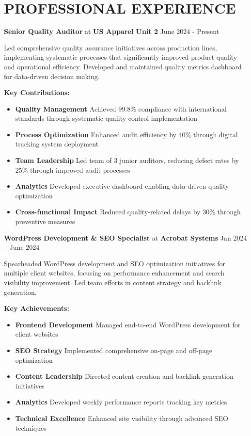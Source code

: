 \documentclass[11pt,a4paper]{article}
\newcommand{\role}[2]{{\large\textbf{#1}} \textcolor{secondary}{at} {\large\textbf{#2}}}
\newcommand{\daterange}[1]{{\color{secondary}\hfill#1}}
\newcommand{\achievement}[2]{\textbf{\textcolor{primary}{#1}} #2}
\begin{document}
\section*{PROFESSIONAL EXPERIENCE}

\role{Senior Quality Auditor}{US Apparel Unit 2} \daterange{June 2024 - Present}
\vspace{0.2cm}

Led comprehensive quality assurance initiatives across production lines, implementing systematic processes that significantly improved product quality and operational efficiency. Developed and maintained quality metrics dashboard for data-driven decision making.

\vspace{0.3cm}
\textbf{\textcolor{primary}{Key Contributions:}}
\begin{itemize}[leftmargin=*,nosep,itemsep=5pt]
\item \achievement{Quality Management}{Achieved 99.8\% compliance with international standards through systematic quality control implementation}
\item \achievement{Process Optimization}{Enhanced audit efficiency by 40\% through digital tracking system deployment}
\item \achievement{Team Leadership}{Led team of 3 junior auditors, reducing defect rates by 25\% through improved audit processes}
\item \achievement{Analytics}{Developed executive dashboard enabling data-driven quality optimization}
\item \achievement{Cross-functional Impact}{Reduced quality-related delays by 30\% through preventive measures}
\end{itemize}

\vspace{0.4cm}
\role{WordPress Development \& SEO Specialist}{Acrobat Systems} \daterange{Jan 2024 – June 2024}
\vspace{0.2cm}

Spearheaded WordPress development and SEO optimization initiatives for multiple client websites, focusing on performance enhancement and search visibility improvement. Led team efforts in content strategy and backlink generation.

\vspace{0.3cm}
\textbf{\textcolor{primary}{Key Achievements:}}
\begin{itemize}[leftmargin=*,nosep,itemsep=5pt]
\item \achievement{Frontend Development}{Managed end-to-end WordPress development for client websites}
\item \achievement{SEO Strategy}{Implemented comprehensive on-page and off-page optimization}
\item \achievement{Content Leadership}{Directed content creation and backlink generation initiatives}
\item \achievement{Analytics}{Developed weekly performance reports tracking key metrics}
\item \achievement{Technical Excellence}{Enhanced site visibility through advanced SEO techniques}
\end{itemize}
\end{document}
